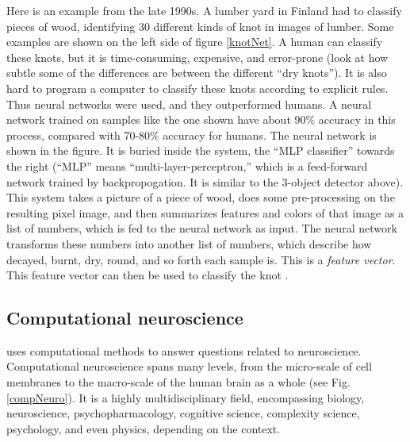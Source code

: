 Here is an example from the late 1990s. A lumber yard in Finland had to classify pieces of wood, identifying 30 different kinds of knot in images of lumber. Some examples are shown on the left side of figure \ref{knotNet}. A human can classify these knots, but it is time-consuming, expensive, and error-prone (look at how subtle some of the differences are between the different ``dry knots''). It is also hard to program a computer to classify these knots according to explicit rules. Thus neural networks were used, and they outperformed humans. A neural network trained on samples like the one shown have about 90\% accuracy in this process, compared with 70-80\% accuracy for humans. The neural network is shown in the figure. It is  buried inside the system, the ``MLP classifier'' towards the right (``MLP'' means ``multi-layer-perceptron,'' which is a feed-forward network trained by backpropogation. It is  similar to the 3-object detector above). This system takes a picture of a piece of wood, does some pre-processing on the resulting pixel image, and then summarizes features and colors of that image as a list of numbers, which is fed to the neural network as input. The neural network transforms these numbers into another list of numbers, which describe how decayed, burnt, dry, round, and so forth each sample is. This is a \emph{feature vector}. This feature vector can then be used to classify the knot \cite{heikkonen1999building}.

\subsection{Computational neuroscience}\label{computationalNeuroscience}

 uses computational methods to answer questions related to neuroscience. Computational neuroscience spans many levels, from the micro-scale of cell membranes to the macro-scale of the human brain as a whole (see Fig. \ref{compNeuro}). It is a highly multidisciplinary field, encompassing biology, neuroscience, psychopharmacology, cognitive science, complexity science, psychology, and even physics, depending on the context. 

